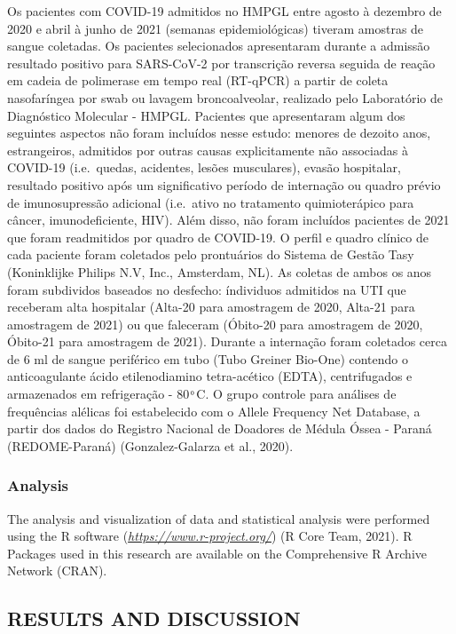 \documentclass[
]{article}
\begin{document}
Os pacientes com COVID-19 admitidos no HMPGL entre agosto à dezembro de 2020 e abril à junho de 2021 (semanas epidemiológicas) tiveram amostras de sangue coletadas. Os pacientes selecionados apresentaram durante a admissão resultado positivo para SARS-CoV-2 por transcrição reversa seguida de reação em cadeia de polimerase em tempo real (RT-qPCR) a partir de coleta nasofaríngea por swab ou lavagem broncoalveolar, realizado pelo Laboratório de Diagnóstico Molecular - HMPGL. Pacientes que apresentaram algum dos seguintes aspectos não foram incluídos nesse estudo: menores de dezoito anos, estrangeiros, admitidos por outras causas explicitamente não associadas à COVID-19 (i.e.~quedas, acidentes, lesões musculares), evasão hospitalar, resultado positivo após um significativo período de internação ou quadro prévio de imunosupressão adicional (i.e.~ativo no tratamento quimioterápico para câncer, imunodeficiente, HIV). Além disso, não foram incluídos pacientes de 2021 que foram readmitidos por quadro de COVID-19.
O perfil e quadro clínico de cada paciente foram coletados pelo prontuários do Sistema de Gestão Tasy (Koninklijke Philips N.V, Inc., Amsterdam, NL). As coletas de ambos os anos foram subdividos baseados no desfecho: índividuos admitidos na UTI que receberam alta hospitalar (Alta-20 para amostragem de 2020, Alta-21 para amostragem de 2021) ou que faleceram (Óbito-20 para amostragem de 2020, Óbito-21 para amostragem de 2021). Durante a internação foram coletados cerca de 6 ml de sangue periférico em tubo (Tubo Greiner Bio-One) contendo o anticoagulante ácido etilenodiamino tetra-acético (EDTA), centrifugados e armazenados em refrigeração - 80 ͦ C.
O grupo controle para análises de frequências alélicas foi estabelecido com o Allele Frequency Net Database, a partir dos dados do Registro Nacional de Doadores de Médula Óssea - Paraná (REDOME-Paraná) (Gonzalez-Galarza et al., 2020).

\hypertarget{analysis}{%
\subsubsection{Analysis}\label{analysis}}

The analysis and visualization of data and statistical analysis were performed using the R software (\emph{\url{https://www.r-project.org/}}) (R Core Team, 2021). R Packages used in this research are available on the Comprehensive R Archive Network (CRAN).

\hypertarget{results-and-discussion}{%
\subsection{RESULTS AND DISCUSSION}\label{results-and-discussion}}
\end{document}
